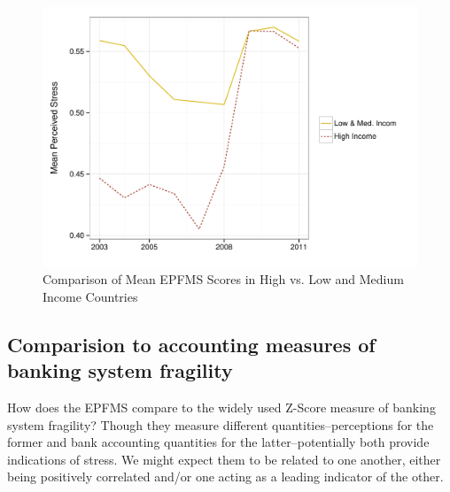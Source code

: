 \documentclass[]{article}
\begin{document}
\begin{figure}
    \caption{Comparison of Mean EPFMS Scores in High vs. Low and Medium Income Countries}
    \label{comp_dev_developing}

    \begin{center}
        \includegraphics[scale=0.45]{analysis/figures/dev_vs_devoloping.pdf}
    \end{center}
\end{figure}

\subsection{Comparision to accounting measures of banking system fragility}

How does the EPFMS compare to the widely used Z-Score measure of banking system fragility? Though they measure different quantities--perceptions for the former and bank accounting quantities for the latter--potentially both provide indications of stress. We might expect them to be related to one another, either being positively correlated and/or one acting as a leading indicator of the other.
\end{document}
